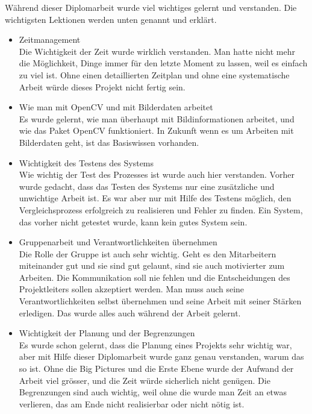 Während dieser Diplomarbeit wurde viel wichtiges gelernt und verstanden. Die wichtigsten Lektionen werden unten genannt und erklärt.\\
\begin{itemize}
	\item Zeitmanagement \\
	
	Die Wichtigkeit der Zeit wurde wirklich verstanden. Man hatte nicht mehr die Möglichkeit, Dinge immer für den letzte Moment zu lassen, weil es einfach zu viel ist. Ohne einen detaillierten Zeitplan und ohne eine systematische Arbeit würde dieses Projekt nicht fertig sein.
	
	\item Wie man mit OpenCV und mit Bilderdaten arbeitet\\
	
	Es wurde gelernt, wie man überhaupt mit Bildinformationen arbeitet, und wie das Paket OpenCV funktioniert. In Zukunft wenn es um Arbeiten mit Bilderdaten geht, ist das Basiswissen vorhanden.
	
	\item Wichtigkeit des Testens des Systems\\
	
	Wie wichtig der Test des Prozesses ist wurde auch hier verstanden. Vorher wurde gedacht, dass das Testen des Systems nur eine zusätzliche und unwichtige Arbeit ist. Es war aber nur mit Hilfe des Testens möglich, den Vergleichsprozess erfolgreich zu realisieren und Fehler zu finden. Ein System, das vorher nicht getestet wurde, kann kein gutes System sein.
	
	\item Gruppenarbeit und Verantwortlichkeiten übernehmen \\
	
	Die Rolle der Gruppe ist auch sehr wichtig. Geht es den Mitarbeitern miteinander gut und sie sind gut gelaunt, sind sie auch motivierter zum Arbeiten. Die Kommunikation soll nie fehlen und die Entscheidungen des Projektleiters sollen akzeptiert werden. Man muss auch seine Verantwortlichkeiten selbst übernehmen und seine Arbeit mit seiner Stärken erledigen. Das wurde alles auch während der Arbeit gelernt.
	
	\item Wichtigkeit der Planung und der Begrenzungen \\
	
	Es wurde schon gelernt, dass die Planung eines Projekts sehr wichtig war, aber mit Hilfe dieser Diplomarbeit wurde ganz genau verstanden, warum das so ist. Ohne die Big Pictures und die Erste Ebene wurde der Aufwand der Arbeit viel grösser, und die Zeit würde sicherlich nicht genügen. Die Begrenzungen sind auch wichtig, weil ohne die wurde man Zeit an etwas verlieren, das am Ende nicht realisierbar oder nicht nötig ist.
	

\end{itemize}
